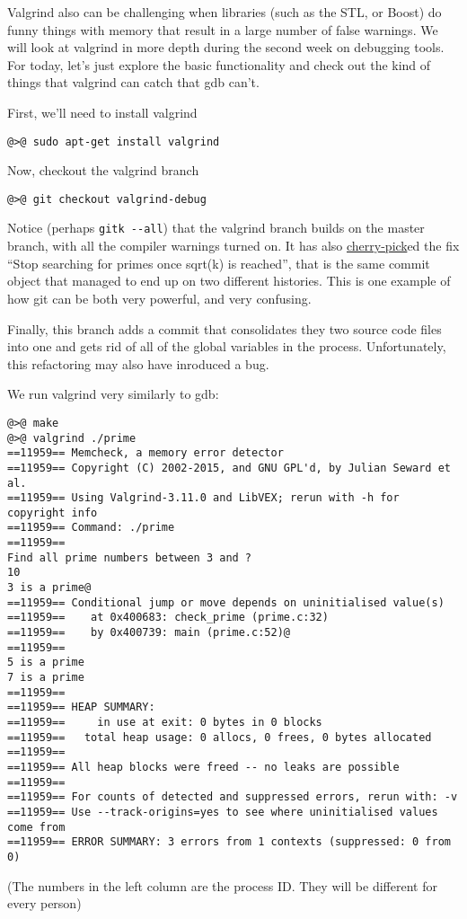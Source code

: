 \documentclass{article}
\begin{document}
Valgrind also can be challenging when libraries (such as the STL, or Boost) do
funny things with memory that result in a large number of false warnings. We
will look at valgrind in more depth during the second week on debugging
tools. For today, let's just explore the basic functionality and check out the
kind of things that valgrind can catch that gdb can't.

First, we'll need to install valgrind
\begin{lstlisting}
@>@ sudo apt-get install valgrind
\end{lstlisting}

Now, checkout the valgrind branch
\begin{lstlisting}
@>@ git checkout valgrind-debug
\end{lstlisting}

Notice (perhaps \texttt{gitk~-{}-all}) that the valgrind branch builds on the
master branch, with all the compiler warnings turned on. It has also
\ul{cherry-pick}ed the fix ``Stop searching for primes once sqrt(k) is
reached'', that is the same commit object that managed to end up on two
different histories.  This is one example of how git can be both very
powerful, and very confusing.

Finally, this branch adds a commit that consolidates they two source code
files into one and gets rid of all of the global variables in the process.
Unfortunately, this refactoring may also have inroduced a bug.

We run valgrind very similarly to gdb:
\begin{lstlisting}
@>@ make
@>@ valgrind ./prime
==11959== Memcheck, a memory error detector
==11959== Copyright (C) 2002-2015, and GNU GPL'd, by Julian Seward et al.
==11959== Using Valgrind-3.11.0 and LibVEX; rerun with -h for copyright info
==11959== Command: ./prime
==11959== 
Find all prime numbers between 3 and ?
10
3 is a prime@
==11959== Conditional jump or move depends on uninitialised value(s)
==11959==    at 0x400683: check_prime (prime.c:32)
==11959==    by 0x400739: main (prime.c:52)@
==11959== 
5 is a prime
7 is a prime
==11959== 
==11959== HEAP SUMMARY:
==11959==     in use at exit: 0 bytes in 0 blocks
==11959==   total heap usage: 0 allocs, 0 frees, 0 bytes allocated
==11959== 
==11959== All heap blocks were freed -- no leaks are possible
==11959== 
==11959== For counts of detected and suppressed errors, rerun with: -v
==11959== Use --track-origins=yes to see where uninitialised values come from
==11959== ERROR SUMMARY: 3 errors from 1 contexts (suppressed: 0 from 0)
\end{lstlisting}
{\small (The numbers in the left column are the process ID. They will be
  different for every person)}
\end{document}
